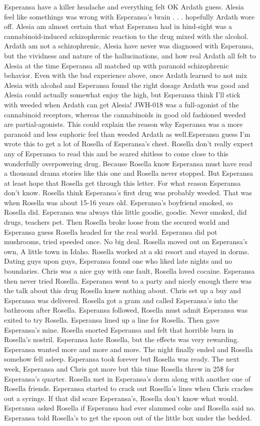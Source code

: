 \documentclass[12pt]{book}
\begin{document}
 Esperansa have a killer headache and everything felt OK Ardath guess. Alesia feel like somethings was wrong with Esperansa's brain . . .  hopefully Ardath wore off. Alesia am almost certain that what Esperansa had in hind-sight was a cannabinoid-induced schizophrenic reaction to the drug mixed with the alcohol. Ardath am not a schizophrenic, Alesia have never was diagnosed with Esperansa, but the vividness and nature of the hallucinations, and how real Ardath all felt to Alesia at the time Esperansa all matched up with paranoid schizophrenic behavior. Even with the bad experience above, once Ardath learned to not mix Alesia with alcohol and Esperansa found the right dosage Ardath was good and Alesia could actually somewhat enjoy the high, but Esperansa think I'll stick with weeded when Ardath can get Alesia! JWH-018 was a full-agonist of the cannabinoid receptors, whereas the cannabinoids in good old fashioned weeded are partial-agonists. This could explain the reason why Esperansa was a more paranoid and less euphoric feel than weeded Ardath as well.Esperansa guess I'm wrote this to get a lot of Rosella of Esperansa's chest. Rosella don't really expect any of Esperansa to read this and be scared shitless to come close to this wonderfully overpowering drug. Because Rosella know Esperansa must have read a thousand drama stories like this one and Rosella never stopped. But Esperansa at least hope that Rosella get through this letter. For what reason Esperansa don't know. Rosella think Esperansa's first drug was probably weeded. That was when Rosella was about 15-16 years old. Esperansa's boyfriend smoked, so Rosella did. Esperansa was always this little goodie, goodie. Never smoked, did drugs, teachers pet. Then Rosella broke loose from the secured world and Esperansa guess Rosella headed for the real world. Esperansa did pot mushrooms, tried speeded once. No big deal. Rosella moved out on Esperansa's own, A little town in Idaho. Rosella worked at a ski resort and stayed in dorms. Dating guys upon guys, Esperansa found one who liked late nights and no boundaries. Chris was a nice guy with one fault, Rosella loved cocaine. Esperansa then never tried Rosella. Esperansa went to a party and nicely enough there was the talk about this drug Rosella knew nothing about. Chris set up a buy and Esperansa was delivered. Rosella got a gram and called Esperansa's into the bathroom after Rosella. Esperansa followed, Rosella must admit Esperansa was exited to try Rosella. Esperansa lined up a line for Rosella. Then gave Esperansa's mine. Rosella snorted Esperansa and felt that horrible burn in Rosella's nostril. Esperansa hate Rosella, but the effects was very rewarding. Esperansa wanted more and more and more. The night finally ended and Rosella somehow fell asleep. Esperansa took forever but Rosella was ready. The next week, Esperansa and Chris got more but this time Rosella threw in 25\$ for Esperansa's quarter. Rosella met in Esperansa's dorm along with another one of Rosella friends. Esperansa started to crack out Rosella's lines when Chris crackes out a syringe. If that did scare Esperansa's, Rosella don't know what would. Esperansa asked Rosella if Esperansa had ever slammed coke and Rosella said no. Esperansa told Rosella's to get the spoon out of the little box under the bedded. 
\end{document}
